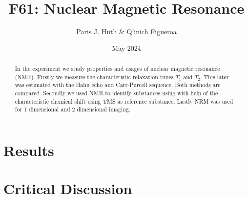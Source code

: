 \documentclass[11 pt]{article}
\title{F61: Nuclear Magnetic Resonance}
\author{Paris J. Huth \& Q'inich Figueroa}
\date{May 2024}
\begin{document}
\maketitle
\begin{center}
\begin{abstract}
In the experiment we study properties and usages of nuclear magnetic resonance (NMR). Firstly we measure the characteristic relaxation times $T_1$ and $T_2$. This later was estimated with the Hahn echo and Carr-Purcell sequence. Both methods are compared. Secondly we used NMR to identify substances using with help of the characteristic chemical shift using TMS as reference substance. Lastly NRM was used for 1 dimensional and 2 dimensional imaging.  
\end{abstract}
\end{center}




\section{Results}
\section{Critical Discussion}
\end{document}
